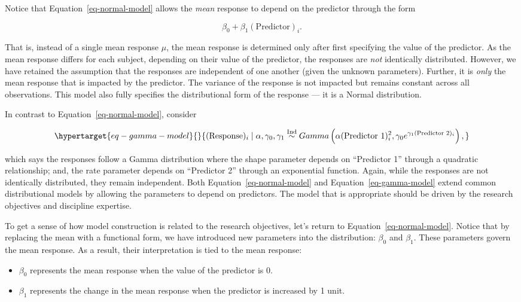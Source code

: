 \documentclass[
  letterpaper,
  DIV=11,
  numbers=noendperiod]{scrreprt}
\providecommand{\tightlist}{%
  \setlength{\itemsep}{0pt}\setlength{\parskip}{0pt}}\usepackage{longtable,booktabs,array}
\theoremstyle{definition}
\theoremstyle{definition}
\theoremstyle{plain}
\theoremstyle{remark}
\begin{document}
Notice that Equation~\ref{eq-normal-model} allows the \emph{mean}
response to depend on the predictor through the form

\[\beta_0 + \beta_1 (\text{Predictor})_i.\]

That is, instead of a single mean response \(\mu\), the mean response is
determined only after first specifying the value of the predictor. As
the mean response differs for each subject, depending on their value of
the predictor, the responses are \emph{not} identically distributed.
However, we have retained the assumption that the responses are
independent of one another (given the unknown parameters). Further, it
is \emph{only} the mean response that is impacted by the predictor. The
variance of the response is not impacted but remains constant across all
observations. This model also fully specifies the distributional form of
the response --- it is a Normal distribution.

In contrast to Equation~\ref{eq-normal-model}, consider

\begin{equation}\protect\hypertarget{eq-gamma-model}{}{(\text{Response})_i \mid \alpha, \gamma_0, \gamma_1 \stackrel{\text{Ind}}{\sim}Gamma\left(\alpha (\text{Predictor 1})_i^2, \gamma_0e^{\gamma_1 (\text{Predictor 2})_i}\right),}\label{eq-gamma-model}\end{equation}

which says the responses follow a Gamma distribution where the shape
parameter depends on ``Predictor 1'' through a quadratic relationship;
and, the rate parameter depends on ``Predictor 2'' through an
exponential function. Again, while the responses are not identically
distributed, they remain independent. Both
Equation~\ref{eq-normal-model} and Equation~\ref{eq-gamma-model} extend
common distributional models by allowing the parameters to depend on
predictors. The model that is appropriate should be driven by the
research objectives and discipline expertise.

To get a sense of how model construction is related to the research
objectives, let's return to Equation~\ref{eq-normal-model}. Notice that
by replacing the mean with a functional form, we have introduced new
parameters into the distribution: \(\beta_0\) and \(\beta_1\). These
parameters govern the mean response. As a result, their interpretation
is tied to the mean response:

\begin{itemize}
\tightlist
\item
  \(\beta_0\) represents the mean response when the value of the
  predictor is 0.
\item
  \(\beta_1\) represents the change in the mean response when the
  predictor is increased by 1 unit.
\end{itemize}
\end{document}

